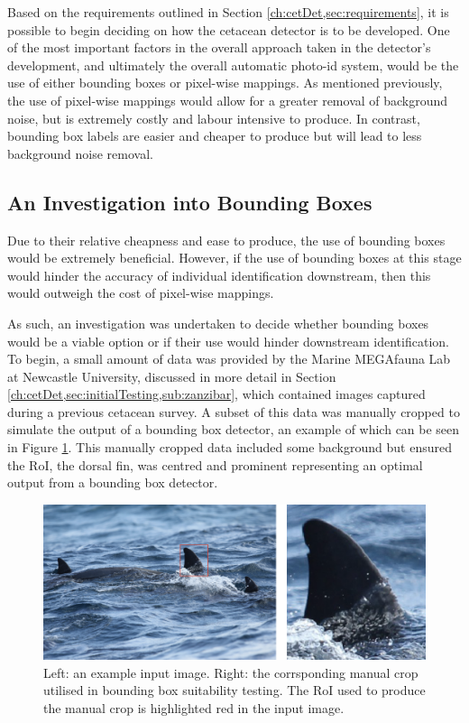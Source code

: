 Based on the requirements outlined in Section \ref{ch:cetDet,sec:requirements}, it is possible to begin deciding on how the cetacean detector is to be developed. One of the most important factors in the overall approach taken in the detector's development, and ultimately the overall automatic photo-id system, would be the use of either bounding boxes or pixel-wise mappings. As mentioned previously, the use of pixel-wise mappings would allow for a greater removal of background noise, but is extremely costly and labour intensive to produce. In contrast, bounding box labels are easier and cheaper to produce but will lead to less background noise removal. 

\subsection{An Investigation into Bounding Boxes}\label{ch:cetDet,sec:deciding,sub:boundingBoxInvestigation}

Due to their relative cheapness and ease to produce, the use of bounding boxes would be extremely beneficial. However, if the use of bounding boxes at this stage would hinder the accuracy of individual identification downstream, then this would outweigh the cost of pixel-wise mappings. 

As such, an investigation was undertaken to decide whether bounding boxes would be a viable option or if their use would hinder downstream identification. To begin, a small amount of data was provided by the Marine MEGAfauna Lab at Newcastle University, discussed in more detail in Section \ref{ch:cetDet,sec:initialTesting,sub:zanzibar}, which contained images captured during a previous cetacean survey. A subset of this data was manually cropped to simulate the output of a bounding box detector, an example of which can be seen in Figure \ref{fig:manual-crop-example}. This manually cropped data included some background but ensured the RoI, the dorsal fin, was centred and prominent representing an optimal output from a bounding box detector. 

\begin{figure}
	\begin{center}
		\includegraphics[scale=0.6]{Chapter3/figs/manual-crop-example-updated.png}
	\end{center}
	\caption[Left: an example input image. Right: the corrsponding manual crop utilised in bounding box suitability testing.]{Left: an example input image. Right: the corrsponding manual crop utilised in bounding box suitability testing. The RoI used to produce the manual crop is highlighted red in the input image.}
	\label{fig:manual-crop-example}
\end{figure}

